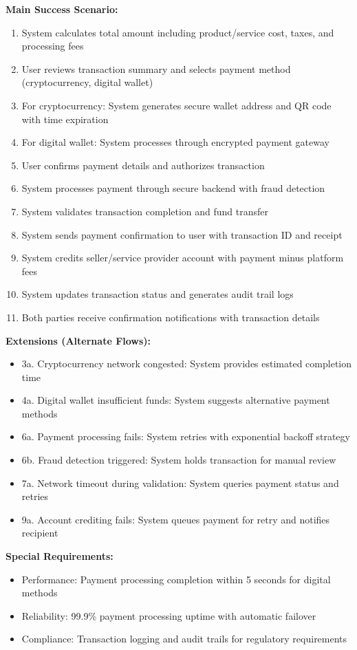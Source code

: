 \textbf{Main Success Scenario:}
\begin{enumerate}
    \item System calculates total amount including product/service cost, taxes, and processing fees
    \item User reviews transaction summary and selects payment method (cryptocurrency, digital wallet)
    \item For cryptocurrency: System generates secure wallet address and QR code with time expiration
    \item For digital wallet: System processes through encrypted payment gateway
    \item User confirms payment details and authorizes transaction
    \item System processes payment through secure backend with fraud detection
    \item System validates transaction completion and fund transfer
    \item System sends payment confirmation to user with transaction ID and receipt
    \item System credits seller/service provider account with payment minus platform fees
    \item System updates transaction status and generates audit trail logs
    \item Both parties receive confirmation notifications with transaction details
\end{enumerate}

\textbf{Extensions (Alternate Flows):}
\begin{itemize}
    \item 3a. Cryptocurrency network congested: System provides estimated completion time
    \item 4a. Digital wallet insufficient funds: System suggests alternative payment methods
    \item 6a. Payment processing fails: System retries with exponential backoff strategy
    \item 6b. Fraud detection triggered: System holds transaction for manual review
    \item 7a. Network timeout during validation: System queries payment status and retries
    \item 9a. Account crediting fails: System queues payment for retry and notifies recipient
\end{itemize}

\textbf{Special Requirements:}
\begin{itemize}

    \item Performance: Payment processing completion within 5 seconds for digital methods
    \item Reliability: 99.9\% payment processing uptime with automatic failover
    \item Compliance: Transaction logging and audit trails for regulatory requirements
\end{itemize}

